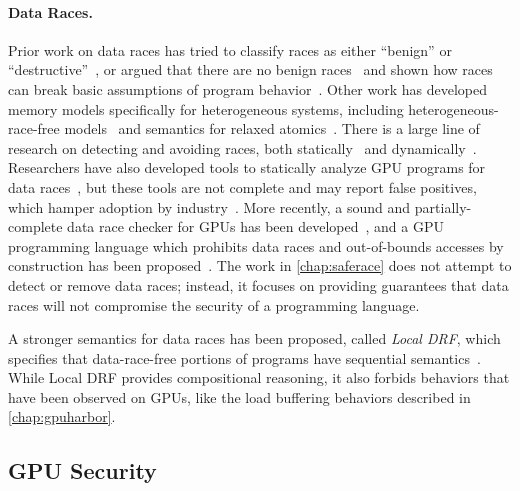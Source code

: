 \paragraph{Data Races.} Prior work on data races has tried to classify races as either ``benign'' or ``destructive''~\cite{narayansamy2007benign,flanagan2010destraces}, or argued that there are no benign races~\cite{boehm2011benign} and shown how races can break basic assumptions of program behavior~\cite{dolan2018bounding}. Other work has developed memory models specifically for heterogeneous systems, including heterogeneous-race-free models~\cite{hower2014hrf} and semantics for relaxed atomics~\cite{sinclair2017rats}. There is a large line of research on detecting and avoiding races, both statically~\cite{pratikakis2011locksmith,flanagan2001static,blackshear2018racerd} and dynamically~\cite{flanagan2009fasttrack,serebryany2009tsan,savage1997eraser}. Researchers have also developed tools to statically analyze GPU programs for data races~\cite{betts2012gpuverify,cogumbreiro2021compdrfgpu,li2010gpusmtverify}, but these tools are not complete and may report false positives, which hamper adoption by industry~\cite{johnson2013nostatic,sadowski2018staticgoogle,nachtigall2019explainingstatic}. More recently, a sound and partially-complete data race checker for GPUs has been developed~\cite{liew2024dataraces}, and a GPU programming language which prohibits data races and out-of-bounds accesses by construction has been proposed~\cite{kopcke2024descend}. The work in \mychap\ref{chap:saferace} does not attempt to detect or remove data races; instead, it focuses on providing guarantees that data races will not compromise the security of a programming language.

A stronger semantics for data races has been proposed, called \textit{Local DRF}, which specifies that data-race-free portions of programs have sequential semantics~\cite{dolan2018bounding}. While Local DRF provides compositional reasoning, it also forbids behaviors that have been observed on GPUs, like the load buffering behaviors described in \mychap\ref{chap:gpuharbor}. %

\subsection{GPU Security}
\label{sec:bg-related-security}

